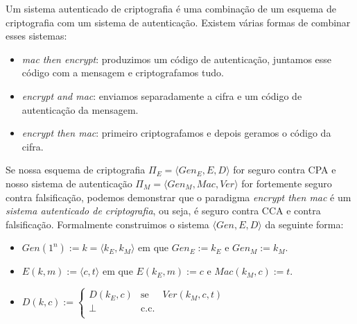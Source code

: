 


Um sistema autenticado de criptografia é uma combinação de um esquema de criptografia com um sistema de autenticação.
Existem várias formas de combinar esses sistemas: 
\begin{itemize}
\item {\em mac then encrypt}: produzimos um código de autenticação, juntamos esse código com a mensagem e criptografamos tudo.
\item {\em encrypt and mac}: enviamos separadamente a cifra e um código de autenticação da mensagem.
\item {\em encrypt then mac}: primeiro criptografamos e depois geramos o código da cifra.
\end{itemize}

Se nossa esquema de criptografia $\Pi_E = \langle Gen_E, E, D\rangle$ for seguro contra CPA e nosso sistema de autenticação $\Pi_M = \langle Gen_M, Mac, Ver \rangle$ for fortemente seguro contra falsificação, podemos demonstrar que o paradigma {\em encrypt then mac} é um {\em sistema autenticado de criptografia}, ou seja, é seguro contra CCA e contra falsificação.
Formalmente construimos o sistema $\langle Gen, E, D \rangle$ da seguinte forma:
\begin{itemize}
\item $Gen(1^n) := k = \langle k_E, k_M \rangle$ em que $Gen_E := k_E$ e $Gen_M := k_M$.
\item $E(k,m) := \langle c, t \rangle$ em que $E(k_E, m) := c$ e $Mac(k_M, c) := t$.
\item $D(k,c) := \left\{
    \begin{array}{lcl}
      D(k_E, c) & \textrm{se} & Ver(k_M, c, t)\\
      \bot & \textrm{c.c.} &\\
    \end{array}
    \right.$
\end{itemize}

